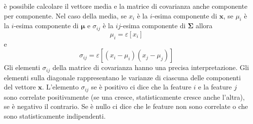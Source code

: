 è possibile calcolare il vettore media e la matrice di covarianza anche componente per componente. Nel caso della media, se $x_i$ è la $i$-esima componente di $\mathbf{x}$, se $\mu_i$ è la $i$-esima componente di $\mathbf{\mu}$ e $\sigma_{ij}$ è la $ij$-esima componente di $\mathbf{\Sigma}$ allora
\begin{equation}
\mu_i = \varepsilon[x_i]
\end{equation}
e
\begin{equation}
\sigma_{ij} = \varepsilon[(x_i - \mu_i) (x_j - \mu_j) ]
\end{equation}
Gli elementi $\sigma_{ij}$ della matrice di covarianza hanno una precisa interpretazione. Gli elementi sulla diagonale rappresentano le varianze di ciascuna delle componenti del vettore $\mathbf{x}$. L’elemento $\sigma_{ij}$ se è positivo ci dice che la feature $i$ e la feature $j$ sono correlate positivamente (se una cresce, statisticamente cresce anche l’altra), se è negativo il contrario. Se è nullo ci dice che le feature non sono correlate o che sono statisticamente indipendenti.\\

